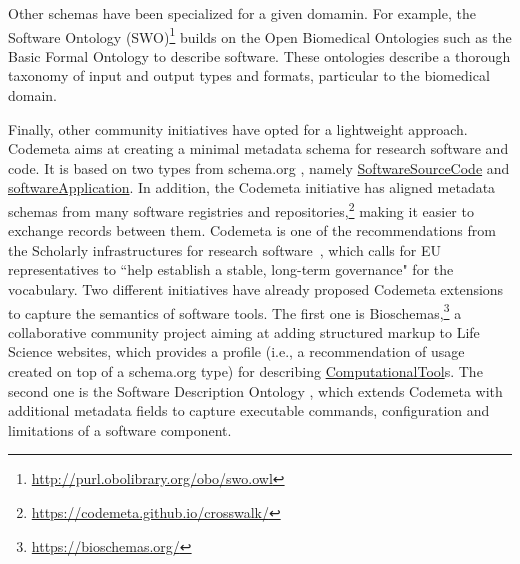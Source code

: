 Other schemas have been specialized for a given domamin. For example, the Software Ontology (SWO)\footnote{\url{http://purl.obolibrary.org/obo/swo.owl}} builds on the Open Biomedical Ontologies such as the Basic Formal Ontology \cite{spear2016functions} to describe software. These ontologies describe a thorough taxonomy of input and output types and formats, particular to the biomedical domain.

Finally, other community initiatives have opted for a lightweight approach. Codemeta \cite{Boettigeral2017} aims at creating a minimal metadata schema for research software and code. It is based on two types from schema.org \cite{guha_schemaorg_2016}, namely \href{https://schema.org/SoftwareSourceCode}{SoftwareSourceCode} and \href{https://schema.org/SoftwareApplication}{softwareApplication}. In addition, the Codemeta initiative has aligned metadata schemas from many software registries and repositories,\footnote{\url{https://codemeta.github.io/crosswalk/}} making it easier to exchange records between them. Codemeta is one of the recommendations from the Scholarly infrastructures for research software~\cite{sirs_2019}, which calls for EU representatives to ``help establish a stable, long-term governance" for the vocabulary. Two different initiatives have already proposed Codemeta extensions to capture the semantics of software tools. The first one is Bioschemas,\footnote{\url{https://bioschemas.org/}} a collaborative community project aiming at adding structured markup to Life Science websites, which provides a profile (i.e., a recommendation of usage created on top of a schema.org type) for describing \href{https://bioschemas.org/profiles/ComputationalTool}{ComputationalTool}s. The second one is the Software Description Ontology \cite{garijo2019okg}, which extends Codemeta with additional metadata fields to capture executable commands, configuration and limitations of a software component. 




